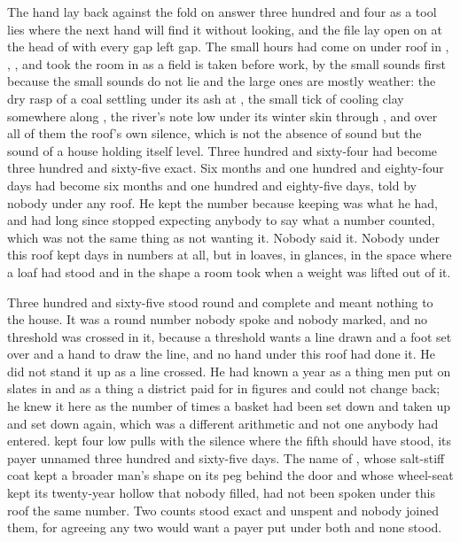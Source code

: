 
The hand lay back against the fold on answer three hundred and four as a tool lies where the next hand will find it without looking, and the file lay open on  at the head of  with every gap left gap. The small hours had come on under  roof in , , , and  took the room in as a field is taken before work, by the small sounds first because the small sounds do not lie and the large ones are mostly weather: the dry rasp of a coal settling under its ash at , the small tick of cooling clay somewhere along , the river's note low under its winter skin through , and over all of them the roof's own silence, which is not the absence of sound but the sound of a house holding itself level. Three hundred and sixty-four had become three hundred and sixty-five exact. Six months and one hundred and eighty-four days had become six months and one hundred and eighty-five days, told by nobody under any roof. He kept the number because keeping was what he had, and had long since stopped expecting anybody to say what a number counted, which was not the same thing as not wanting it. Nobody said it. Nobody under this roof kept days in numbers at all, but in loaves, in glances, in the space where a loaf had stood and in the shape a room took when a weight was lifted out of it.

Three hundred and sixty-five stood round and complete and meant nothing to the house. It was a round number nobody spoke and nobody marked, and no threshold was crossed in it, because a threshold wants a line drawn and a foot set over and a hand to draw the line, and no hand under this roof had done it. He did not stand it up as a line crossed. He had known a year as a thing men put on slates in  and as a thing a district paid for in figures and could not change back; he knew it here as the number of times a basket had been set down and taken up and set down again, which was a different arithmetic and not one anybody had entered.  kept four low pulls with the silence where the fifth should have stood, its payer unnamed three hundred and sixty-five days. The name of , whose salt-stiff coat kept a broader man's shape on its peg behind the door and whose wheel-seat kept its twenty-year hollow that nobody filled, had not been spoken under this roof the same number. Two counts stood exact and unspent and nobody joined them, for agreeing any two would want a payer put under both and none stood.

